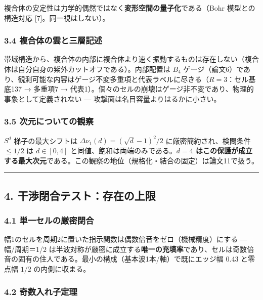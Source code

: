 \documentclass[
]{ltjsarticle}
\begin{document}
複合体の安定性は力学的偶然ではなく\textbf{変形空間の量子化}である（Bohr
模型との構造対応 {[}7{]}。同一視はしない）。

\subsubsection{3.4
複合体の雲と三層記述}\label{ux8907ux5408ux4f53ux306eux96f2ux3068ux4e09ux5c64ux8a18ux8ff0}

帯域構造から、複合体の内部に複合体より速く振動するものは存在しない（複合体は自分自身の紫外カットオフである）。内部配置は
\(B_4\)
ゲージ（論文6）であり、観測可能な内容はゲージ不変多重項と代表ラベルに尽きる（\(R=3\)：セル基底137
→ 多重項7 →
代表1）。個々のセルの崩壊はゲージ非不変であり、物理的事象として定義されない
--- 攻撃面は名目容量よりはるかに小さい。

\subsubsection{3.5
次元についての観察}\label{ux6b21ux5143ux306bux3064ux3044ux3066ux306eux89b3ux5bdf}

\(S^d\) 梯子の最大シフトは \(\Delta\nu_1(d)=(\sqrt d-1)^2/2\)
に厳密簡約され、検閲条件 \(\le1/2\) は \(d\in[0,4]\)
と同値、飽和は両端のみである。\textbf{\(d=4\)
はこの保護が成立する最大次元}である。この観察の地位（規格化・結合の固定）は論文11で扱う。

\begin{center}\rule{0.5\linewidth}{0.5pt}\end{center}

\subsection{4.
干渉閉合テスト：存在の上限}\label{ux5e72ux6e09ux9589ux5408ux30c6ux30b9ux30c8ux5b58ux5728ux306eux4e0aux9650}

\subsubsection{4.1
単一セルの厳密閉合}\label{ux5358ux4e00ux30bbux30ebux306eux53b3ux5bc6ux9589ux5408}

幅1のセルを周期2に置いた指示関数は偶数倍音をゼロ（機械精度）にする ---
幅/周期＝1/2
は半波対称が厳密に成立する\textbf{唯一の充填率}であり、セルは奇数倍音の固有の住人である。最小の構成（基本波1本/軸）で既にエッジ幅
0.43 と零点幅 \(1/2\) の内側に収まる。

\subsubsection{4.2
奇数入れ子定理}\label{ux5947ux6570ux5165ux308cux5b50ux5b9aux7406}
\end{document}

